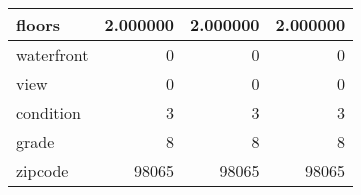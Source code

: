 \begin{table}[H]
\begin{tabular}{|l|r|r|r|}
\hline floors & \cellcolor[rgb]{0.9, 0.54, 0.52} 2.000000 & \cellcolor[rgb]{0.9, 0.54, 0.52} 2.000000 & \cellcolor[rgb]{0.9, 0.54, 0.52} 2.000000 \\
\hline waterfront & \cellcolor[rgb]{0.9, 0.54, 0.52} 0 & \cellcolor[rgb]{0.9, 0.54, 0.52} 0 & \cellcolor[rgb]{0.9, 0.54, 0.52} 0 \\
\hline view & \cellcolor[rgb]{0.9, 0.54, 0.52} 0 & \cellcolor[rgb]{0.9, 0.54, 0.52} 0 & \cellcolor[rgb]{0.9, 0.54, 0.52} 0 \\
\hline condition & \cellcolor[rgb]{0.9, 0.54, 0.52} 3 & \cellcolor[rgb]{0.9, 0.54, 0.52} 3 & \cellcolor[rgb]{0.9, 0.54, 0.52} 3 \\
\hline grade & \cellcolor[rgb]{0.9, 0.54, 0.52} 8 & \cellcolor[rgb]{0.9, 0.54, 0.52} 8 & \cellcolor[rgb]{0.9, 0.54, 0.52} 8 \\
\hline zipcode & \cellcolor[rgb]{0.9, 0.54, 0.52} 98065 & \cellcolor[rgb]{0.9, 0.54, 0.52} 98065 & \cellcolor[rgb]{0.9, 0.54, 0.52} 98065 \\
\hline
\end{tabular}
\end{table}
